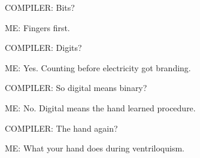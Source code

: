 \documentclass[11pt,oneside]{book}
\begin{document}
COMPILER: Bits?



ME: Fingers first.



COMPILER: Digits?



ME: Yes. Counting before electricity got branding.



COMPILER: So digital means binary?



ME: No. Digital means the hand learned procedure.



COMPILER: The hand again?



ME: What your hand does during ventriloquism.
\end{document}
